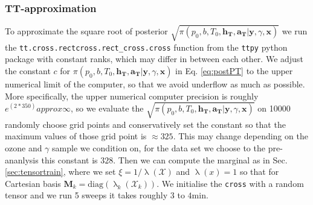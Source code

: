 \subsubsection{TT-approximation}
To approximate the square root of posterior $\sqrt{\pi(p_0,b,T_0,\bm{h_T},\bm{a_T} | \bm{y}, \gamma, \bm{x})}$ we run the  \texttt{tt.cross.rectcross.rect\_cross.cross} function from the \texttt{ttpy} python package \cite{Oseledets2018ttpy} with constant ranks, which may differ in between each other.
We adjust the constant $c$ for $\pi(p_0,b,T_0,\bm{h_T},\bm{a_T} | \bm{y}, \gamma, \bm{x})$ in Eq. \ref{eq:postPT} to the upper numerical limit of the computer, so that we avoid underflow as much as possible.
More specifically, the upper numerical computer precision is roughly $e^(2*350) approx \infty$, so we evaluate the  $\sqrt{\pi(p_0,b,T_0,\bm{h_T},\bm{a_T} | \bm{y}, \gamma, \bm{x})}$ on 10000 randomly choose grid points and conservatively set the constant so that the maximum values of those grid point is $\approx 325$.
This may change depending on the ozone and $\gamma$ sample we condition on, for the data set we choose to the pre-ananlysis this constant is $328$. 
Then we can compute the marginal as in Sec. \ref{sec:tensortrain}, where we set $\xi = 1 / \uplambda (\mathcal{X})$ and $\uplambda(x) = 1$ so that for Cartesian basis $\bm{M}_k = \text{diag}(\uplambda_k(\mathcal{X}_k))$.
We initialise the \texttt{cross}  with a random tensor and we run 5 sweeps it takes roughly $3$ to $4$min.

